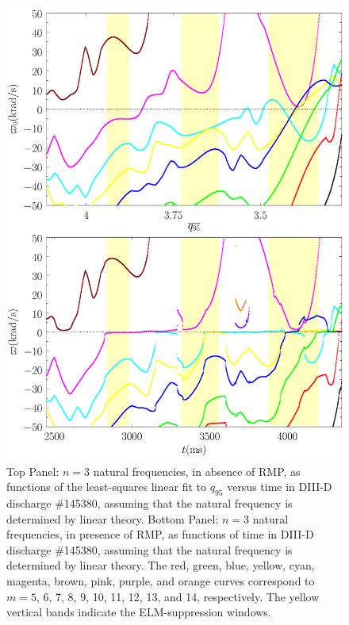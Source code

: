 \documentclass[12pt,prb,aps]{revtex4-1}
\begin{document}
\begin{figure}
\includegraphics[height=6in]{fig7.pdf}
\caption{Top Panel: $n=3$ natural frequencies, in absence of RMP, as functions of the least-squares linear fit to $q_{95}$ versus time
in   DIII-D discharge \#145380, assuming that the natural frequency is determined by linear theory.
Bottom Panel:  $n=3$ natural frequencies, in presence of RMP, as functions of time
in   DIII-D discharge \#145380, assuming that the natural frequency is determined by linear theory. The red, green, blue, yellow, cyan, magenta, brown, pink,
purple, and orange  curves correspond to $m=5$, 6, 7, 8, 9, 10, 11, 12, 13, and 14, respectively. The yellow vertical bands indicate the ELM-suppression windows.} \label{fig7}
\end{figure}
\end{document}
